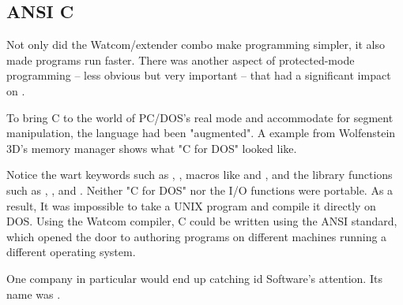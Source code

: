 \subsection{ANSI C}
Not only did the Watcom/extender combo make programming simpler, it also made programs run faster. There was another aspect of protected-mode programming -- less obvious but very important -- that had a significant impact on \doom.\\
\par
To bring C to the world of PC/DOS's real mode and accommodate for segment manipulation, the language had been "augmented". A example from Wolfenstein 3D's memory manager shows what "C for DOS" looked like.\\
\par
{}
\par
Notice the wart keywords such as , , macros like  and , and the  library functions such as , , and . Neither "C for DOS" nor the I/O functions were portable. As a result, It was impossible to take a UNIX program and compile it directly on DOS. Using the Watcom compiler, C could be written using the ANSI standard, which opened the door to authoring programs on different machines running a different operating system.\\
\par
 One company in particular would end up catching id Software's attention. Its name was \NeXTns.
